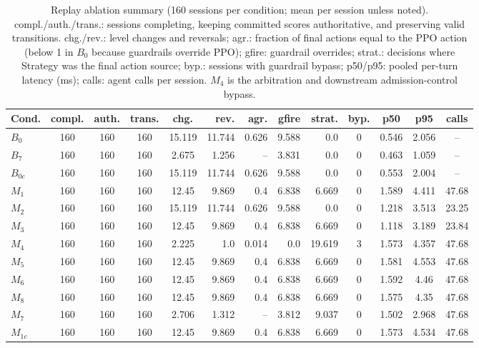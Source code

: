 \documentclass[runningheads,a4paper]{llncs}
\begin{document}
\begin{table}[!htbp]
\caption{Replay ablation summary (160 sessions per condition; mean per session unless noted). compl./auth./trans.: sessions completing, keeping committed scores authoritative, and preserving valid transitions. chg./rev.: level changes and reversals; agr.: fraction of final actions equal to the PPO action (below 1 in $B_0$ because guardrails override PPO); gfire: guardrail overrides; strat.: decisions where Strategy was the final action source; byp.: sessions with guardrail bypass; p50/p95: pooled per-turn latency (ms); calls: agent calls per session. $M_4$ is the arbitration and downstream admission-control bypass.}
\label{tab:ablation}
\centering\scriptsize
\begin{tabular}{@{}lccccrrrrcccc@{}}
\toprule
Cond. & compl. & auth. & trans. & chg. & rev. & agr. & gfire & strat. & byp. & p50 & p95 & calls\\
\midrule
$B_0$ & 160&160&160& 15.119& 11.744& 0.626& 9.588& 0.0& 0& 0.546& 2.056& --\\
$B_7$ & 160&160&160& 2.675& 1.256& --& 3.831& 0.0& 0& 0.463& 1.059& --\\
$B_{0c}$ & 160&160&160& 15.119& 11.744& 0.626& 9.588& 0.0& 0& 0.553& 2.004& --\\
$M_1$ & 160&160&160& 12.45& 9.869& 0.4& 6.838& 6.669& 0& 1.589& 4.411& 47.68\\
$M_2$ & 160&160&160& 15.119& 11.744& 0.626& 9.588& 0.0& 0& 1.218& 3.513& 23.25\\
$M_3$ & 160&160&160& 12.45& 9.869& 0.4& 6.838& 6.669& 0& 1.118& 3.189& 23.84\\
$M_4$ & 160&160&160& 2.225& 1.0& 0.014& 0.0& 19.619& 3& 1.573& 4.357& 47.68\\
$M_5$ & 160&160&160& 12.45& 9.869& 0.4& 6.838& 6.669& 0& 1.581& 4.553& 47.68\\
$M_6$ & 160&160&160& 12.45& 9.869& 0.4& 6.838& 6.669& 0& 1.592& 4.46& 47.68\\
$M_8$ & 160&160&160& 12.45& 9.869& 0.4& 6.838& 6.669& 0& 1.575& 4.35& 47.68\\
$M_7$ & 160&160&160& 2.706& 1.312& --& 3.812& 9.037& 0& 1.502& 2.968& 47.68\\
$M_{1c}$ & 160&160&160& 12.45& 9.869& 0.4& 6.838& 6.669& 0& 1.573& 4.534& 47.68\\
\bottomrule
\end{tabular}
\end{table}
\end{document}
